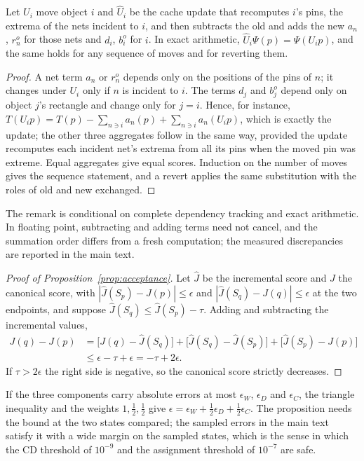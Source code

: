 \begin{appremark}\label{rem:cache}
Let $U_i$ move object $i$ and $\widehat U_i$ be the cache update that recomputes
$i$'s pins, the extrema of the nets incident to $i$, and then subtracts the old and
adds the new $a_n$, $r_n^o$ for those nets and $d_i$, $b_i^o$ for $i$. In exact
arithmetic, $\widehat U_i\Psi(p)=\Psi(U_ip)$, and the same holds for any sequence of
moves and for reverting them.
\end{appremark}
\begin{proof}
A net term $a_n$ or $r_n^o$ depends only on the positions of the pins of $n$; it
changes under $U_i$ only if $n$ is incident to $i$. The terms $d_j$ and $b_j^o$
depend only on object $j$'s rectangle and change only for $j=i$. Hence, for
instance, $T(U_ip)=T(p)-\sum_{n\ni i}a_n(p)+\sum_{n\ni i}a_n(U_ip)$, which is exactly
the update; the other three aggregates follow in the same way, provided the update
recomputes each incident net's extrema from all its pins when the moved pin was
extreme. Equal aggregates give equal scores. Induction on the number of moves gives
the sequence statement, and a revert applies the same substitution with the roles of
old and new exchanged.
\end{proof}
The remark is conditional on complete dependency tracking and exact arithmetic. In
floating point, subtracting and adding terms need not cancel, and the summation
order differs from a fresh computation; the measured discrepancies are reported in
the main text.

\begin{proof}[Proof of Proposition~\ref{prop:acceptance}]
Let $\widehat J$ be the incremental score and $J$ the canonical score, with
$|\widehat J(S_p)-J(p)|\le\epsilon$ and $|\widehat J(S_q)-J(q)|\le\epsilon$ at the two
endpoints, and suppose $\widehat J(S_q)\le\widehat J(S_p)-\tau$. Adding and
subtracting the incremental values,
\begin{align*}
 J(q)-J(p)
 &=\bigl[J(q)-\widehat J(S_q)\bigr]+\bigl[\widehat J(S_q)-\widehat J(S_p)\bigr]
   +\bigl[\widehat J(S_p)-J(p)\bigr]\\
 &\le\epsilon-\tau+\epsilon=-\tau+2\epsilon .
\end{align*}
If $\tau>2\epsilon$ the right side is negative, so the canonical score strictly
decreases.
\end{proof}
If the three components carry absolute errors at most $\epsilon_W$,
$\epsilon_D$ and $\epsilon_C$, the triangle inequality and
the weights $1,\tfrac12,\tfrac12$ give
$\epsilon=\epsilon_W+\tfrac12\epsilon_D+\tfrac12\epsilon_C$.
The proposition needs the bound at the two states compared; the sampled errors in the
main text satisfy it with a wide margin on the sampled states, which is the sense in
which the CD threshold of $10^{-9}$ and the assignment threshold of $10^{-7}$ are safe.

